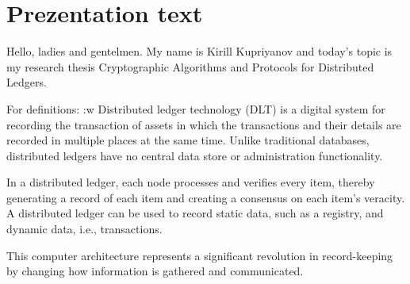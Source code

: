 \documentclass[12pt]{article}
\begin{document}
\section*{Prezentation text}

Hello, ladies and gentelmen. My name is Kirill Kupriyanov and today's topic is
my research thesis Cryptographic Algorithms and Protocols for Distributed
Ledgers.

For definitions:
:w
Distributed ledger technology (DLT) is a digital system for recording the transaction of assets in which the transactions and their details are recorded in multiple places at the same time. Unlike traditional databases, distributed ledgers have no central data store or administration functionality.


In a distributed ledger, each node processes and verifies every item, thereby generating a record of each item and creating a consensus on each item's veracity. A distributed ledger can be used to record static data, such as a registry, and dynamic data, i.e., transactions.

This computer architecture represents a significant revolution in record-keeping by changing how information is gathered and communicated.
\end{document}
